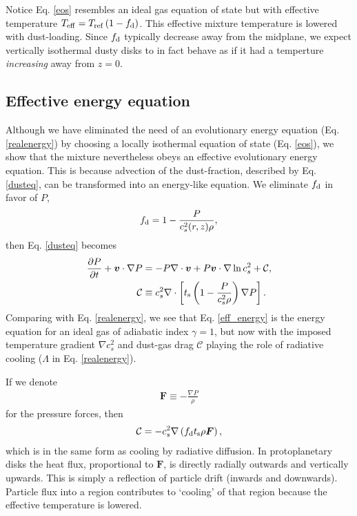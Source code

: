 Notice Eq. \ref{eos} resembles an ideal gas equation of state but with  
effective temperature $T_\mathrm{eff} = 
T_\mathrm{ref}\left(1-f_\mathrm{d}\right)$. %
This effective mixture  
temperature is lowered with dust-loading. 
Since $f_\mathrm{d}$ typically decrease away from the midplane, we expect
vertically isothermal dusty disks to in fact behave as if it had a
temperture \emph{increasing} away from $z=0$.  

\subsection{Effective energy equation}
Although we have eliminated the need of an evolutionary energy
equation (Eq. \ref{realenergy}) by choosing a locally isothermal
equation of state (Eq. \ref{eos}), we show that the mixture 
nevertheless obeys an effective evolutionary energy equation. This is
because advection of the dust-fraction, described by
Eq. \ref{dusteq}, can be transformed into an energy-like 
equation. We 
eliminate $f_\mathrm{d}$ in favor of $P$, 
\begin{align*}
  f_\mathrm{d} = 1 - \frac{P}{c_s^2(r,z)\rho}, 
\end{align*}
then Eq. \ref{dusteq} becomes
\begin{align}
\frac{\partial P}{\partial t} + \bm{v}\cdot\nabla P  
&= - P \nabla\cdot\bm{v} + P\bm{v}\cdot\nabla\ln{c_s^2}
                + \mathcal{C},  \label{eff_energy} \\
\mathcal{C}&\equiv c_s^2 \nabla\cdot\left[t_\mathrm{s}\left(1 -
  \frac{P}{c_s^2\rho}\right)\nabla 
  P\right].
\end{align}
Comparing with Eq. \ref{realenergy}, we see that 
Eq. \ref{eff_energy} is the energy equation for an ideal gas of
adiabatic index $\gamma=1$, but now with the imposed temperature
gradient $\nabla c_s^2$ and dust-gas drag $\mathcal{C}$ playing the
role of radiative cooling ($\Lambda$ in 
Eq. \ref{realenergy}). 

If we denote 
\begin{align}
  \bm{F} \equiv  - \frac{\nabla P}{\rho}
\end{align}
for the pressure forces, then
\begin{align*}
  \mathcal{C} = - c_s^2\nabla \left( f_\mathrm{d} t_\mathrm{s} \rho \bm{F}
  \right), 
\end{align*}
which is in the same form as cooling by radiative diffusion. In protoplanetary
disks the heat flux, proportional to $\bm{F}$, is directly radially
outwards and vertically upwards. This is simply a reflection of
particle drift (inwards and downwards). Particle flux into a region contributes
to `cooling' of that region because the effective temperature is
lowered. 

